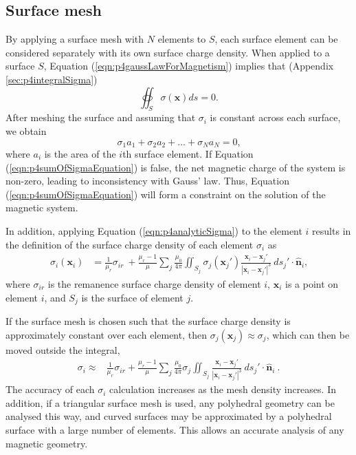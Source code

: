 \subsection{Surface mesh}
By applying a surface mesh with \(N\) elements to \(S\), each surface element can be considered separately with its own surface charge density. When applied to a surface \(S\), Equation (\ref{eqn:p4gaussLawForMagnetism}) implies that (Appendix \ref{sec:p4integralSigma})
\begin{equation}
    \oiint_S \sigma \left(\mathbf{x}\right) ds = 0 \text{.}
\end{equation}
After meshing the surface and assuming that \(\sigma_i\) is constant across each surface, we obtain
\begin{equation}\label{eqn:p4sumOfSigmaEquation}
    \sigma_1 a_1 + \sigma_2 a_2 + \dots + \sigma_N a_N = 0 \text{,}
\end{equation}
where \(a_i\) is the area of the \(i\)th surface element. If Equation (\ref{eqn:p4sumOfSigmaEquation}) is false, the net magnetic charge of the system is non-zero, leading to inconsistency with Gauss' law. Thus, Equation (\ref{eqn:p4sumOfSigmaEquation}) will form a constraint on the solution of the magnetic system.

In addition, applying Equation (\ref{eqn:p4analyticSigma}) to the element \(i\) results in the definition of the surface charge density of each element \(\sigma_i\) as
\begin{align}
    \sigma_i \left( \mathbf{x}_i \right) &= \frac{1}{\mu_r} \sigma_{ir}\ + \frac{\mu_r - 1}{\mu} \sum_j \frac{\mu_0}{4\pi} \iint_{S_j} \sigma_j \left( \mathbf{x}_j' \right) \frac{\mathbf{x}_i - \mathbf{x}_j'}{\left| \mathbf{x}_i - \mathbf{x}_j' \right|^3} \ ds_j' \cdot \hat{\mathbf{n}}_i \text{,}
\end{align}
where \(\sigma_{ir}\) is the remanence surface charge density of element \(i\), \(\mathbf{x}_i\) is a point on element \(i\), and \(S_j\) is the surface of element \(j\).

If the surface mesh is chosen such that the surface charge density is approximately constant over each element, then \(\sigma_j \left( \mathbf{x}_j \right) \approx \sigma_j\), which can then be moved outside the integral,
\begin{align}\label{eqn:p4analyticSigmaDiscretised}
    \sigma_i \approx & \frac{1}{\mu_r} \sigma_{ir} + \frac{\mu_r - 1}{\mu} \sum_j \frac{\mu_0}{4\pi} \sigma_j \iint_{S_j} \frac{\mathbf{x}_i - \mathbf{x}_j'}{\left| \mathbf{x}_i - \mathbf{x}_j' \right|^3} \ ds_j' \cdot \hat{\mathbf{n}}_i \ \text{.}
\end{align}
The accuracy of each \(\sigma_i\) calculation increases as the mesh density increases. In addition, if a triangular surface mesh is used, any polyhedral geometry can be analysed this way, and curved surfaces may be approximated by a polyhedral surface with a large number of elements. This allows an accurate analysis of any magnetic geometry.

